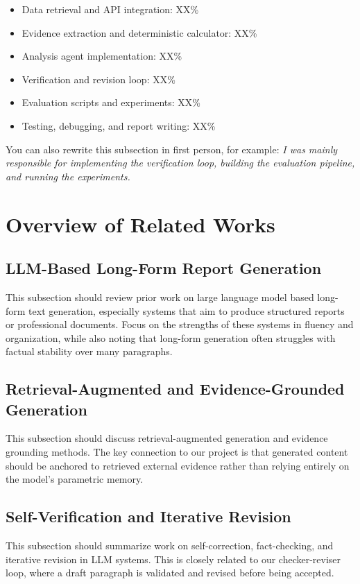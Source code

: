 \documentclass[11pt,a4paper]{article}
\begin{document}
\begin{itemize}[leftmargin=1.5em]
    \item Data retrieval and API integration: XX\%
    \item Evidence extraction and deterministic calculator: XX\%
    \item Analysis agent implementation: XX\%
    \item Verification and revision loop: XX\%
    \item Evaluation scripts and experiments: XX\%
    \item Testing, debugging, and report writing: XX\%
\end{itemize}

You can also rewrite this subsection in first person, for example:
\textit{I was mainly responsible for implementing the verification loop,
building the evaluation pipeline, and running the experiments.}

\section{Overview of Related Works}

\subsection{LLM-Based Long-Form Report Generation}
This subsection should review prior work on large language model based
long-form text generation, especially systems that aim to produce structured
reports or professional documents. Focus on the strengths of these systems in
fluency and organization, while also noting that long-form generation often
struggles with factual stability over many paragraphs.

\subsection{Retrieval-Augmented and Evidence-Grounded Generation}
This subsection should discuss retrieval-augmented generation and evidence
grounding methods. The key connection to our project is that generated content
should be anchored to retrieved external evidence rather than relying entirely
on the model's parametric memory.

\subsection{Self-Verification and Iterative Revision}
This subsection should summarize work on self-correction, fact-checking, and
iterative revision in LLM systems. This is closely related to our
checker-reviser loop, where a draft paragraph is validated and revised before
being accepted.
\end{document}
